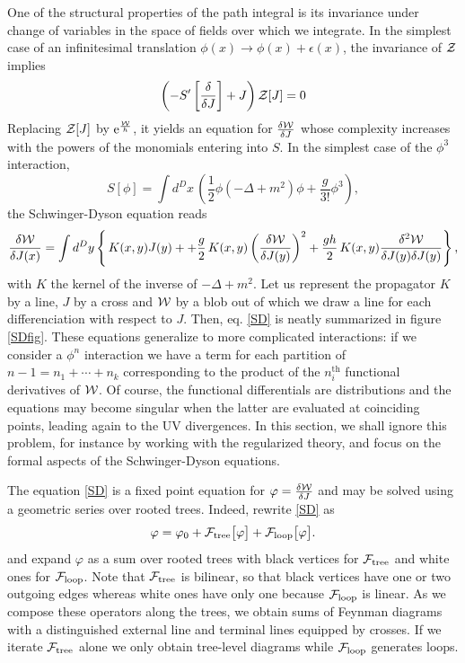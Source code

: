 \documentclass[10pt,here,feynmf]{article}
\begin{document}
One of the structural properties of the path integral is its invariance under change of variables in the space of fields over which we integrate. In the simplest case of an infinitesimal translation $\phi(x)\rightarrow\phi(x)+\epsilon(x)$, the invariance of ${\cal Z}$ implies
\begin{equation}
\left(-S'\left[\frac{\delta}{\delta J}\right]+J\right){\cal Z}[J]=0
\end{equation} 
Replacing ${\cal Z}[J]$ by $\mathrm{e}^{\frac{{\cal W}}{h}}$, it yields an equation for $\frac{\delta{\cal W}}{\delta J}$ whose complexity increases with the powers of the monomials entering into $S$.
In the simplest case of the $\phi^{3}$ interaction,
\begin{equation}
S[\phi]=\int{d^{D}x}\,\left(\frac{1}{2}\phi\left(-\Delta+m^{2}\right)\phi+\frac{g}{3!}\phi^{3}\right),
\end{equation}
the Schwinger-Dyson equation reads
\begin{equation}
\frac{\delta{\cal W}}{\delta J(x)}=\int d^{D}y\left\{\,K(x,y)J(y)+
+\frac{g}{2}\,K(x,y)\left(\frac{\delta {\cal W}}{\delta J(y)}\right)^{2}
+\frac{gh}{2}\,K(x,y)\frac{\delta^{2}{\cal W}}{\delta J(y)\delta J(y)}\right\},\label{SD}
\end{equation}
with $K$ the kernel of the inverse of $-\Delta+m^{2}$. Let us represent the propagator  $K$ by a line, $J$ by a cross and ${\cal W}$ by a blob out of which we draw a line for each differenciation with respect to $J$. Then, eq. \eqref{SD} is neatly summarized in figure \ref{SDfig}. These equations generalize to more complicated interactions: if we consider a $\phi^{n}$ interaction we have a term for each partition of $n-1=n_{1}+\cdots+n_{k}$ corresponding to the product of the $n_{i}^{\mathrm{th}}$ functional derivatives of ${\cal W}$. Of course, the functional differentials are distributions and the equations may become singular when the latter are evaluated at coinciding points, leading again to the UV divergences. In this section, we shall ignore this problem, for instance by working with the regularized theory, and focus on the formal aspects of the Schwinger-Dyson equations. 
  
The equation \eqref{SD} is a fixed point equation for $\varphi=\frac{\delta {\cal W}}{\delta J}$ and may be solved using a geometric series over rooted  trees. Indeed, rewrite  \eqref{SD} as
\begin{equation}
\varphi=\varphi_{0}+{\cal F}_{\mathrm{tree}}\big[\varphi\big]+{\cal F}_{\mathrm{loop}}\big[\varphi\big].
\end{equation}
and expand $\varphi$ as a sum over rooted trees with black vertices for ${\cal F}_{\mathrm{tree}}$ and white ones for ${\cal F}_{\mathrm{loop}}$. Note that ${\cal F}_{\mathrm{tree}}$ is bilinear, so that black vertices have one or two outgoing edges whereas white ones have only one because ${\cal F}_{\mathrm{loop}}$ is linear. As we compose these operators along the trees, we obtain sums of Feynman diagrams with a distinguished external line and terminal lines equipped by crosses. If we iterate ${\cal F}_{\mathrm{tree}}$ alone we only obtain tree-level diagrams while ${\cal F}_{\mathrm{loop}}$ generates loops.   
\end{document}
